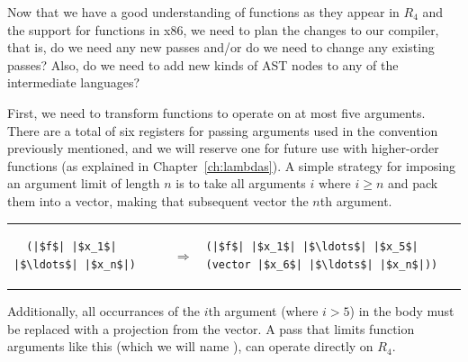 \documentclass[11pt]{book}
\begin{document}
Now that we have a good understanding of functions as they appear in
$R_4$ and the support for functions in x86, we need to plan the
changes to our compiler, that is, do we need any new passes and/or do
we need to change any existing passes? Also, do we need to add new
kinds of AST nodes to any of the intermediate languages?

First, we need to transform functions to operate on at most five
arguments.  There are a total of six registers for passing arguments
used in the convention previously mentioned, and we will reserve one
for future use with higher-order functions (as explained in
Chapter~\ref{ch:lambdas}). A simple strategy for imposing an argument
limit of length $n$ is to take all arguments $i$ where $i \geq n$ and
pack them into a vector, making that subsequent vector the $n$th
argument.

\begin{tabular}{lll}
\begin{minipage}{0.2\textwidth}
\begin{lstlisting}
  (|$f$| |$x_1$| |$\ldots$| |$x_n$|) 
\end{lstlisting}
\end{minipage}
&
$\Rightarrow$
&
\begin{minipage}{0.4\textwidth}
\begin{lstlisting}
(|$f$| |$x_1$| |$\ldots$| |$x_5$| (vector |$x_6$| |$\ldots$| |$x_n$|))
\end{lstlisting}
\end{minipage}
\end{tabular}

Additionally, all occurrances of the $i$th argument (where $i>5$) in
the body must be replaced with a projection from the vector. A pass
that limits function arguments like this (which we will name
), can operate directly on $R_4$.
\end{document}
